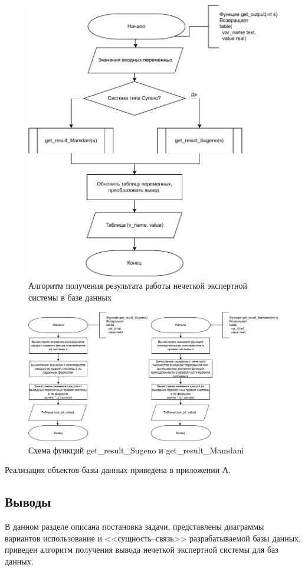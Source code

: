 \begin{figure}[H]
	\centering
	\includegraphics[width=0.7\linewidth]{img/algorithm}
	\caption{Алгоритм получения результата работы нечеткой экспертной системы в базе данных}
	\label{fig:algorithm}
\end{figure}
\begin{figure}[H]
	\centering
	\includegraphics[width=1\linewidth]{img/get_result_funcs}
	\caption{Схема функций get\_result\_Sugeno и get\_result\_Mamdani}
	\label{fig:getresultfuncs}
\end{figure}

Реализация объектов базы данных приведена в приложении А.

\subsection{Выводы}
В данном разделе описана постановка задачи, представлены диаграммы вариантов использование и <<сущность--связь>> разрабатываемой базы данных, приведен алгоритм получения вывода нечеткой экспертной системы для баз данных.

\pagebreak
